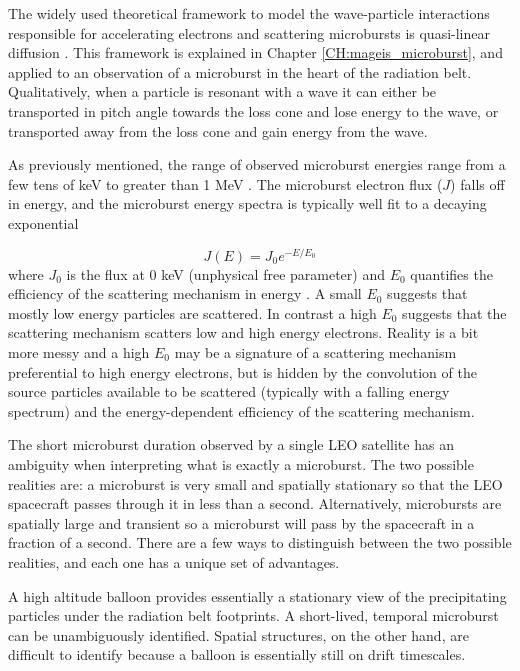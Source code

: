 The widely used theoretical framework to model the wave-particle interactions responsible for accelerating electrons and scattering microbursts is quasi-linear diffusion \citep[e.g.][]{Walker1993, Summers1998, Meredith2002, Horne2005, Thorne2005, Summers2005}. This framework is explained in Chapter \ref{CH:mageis_microburst}, and applied to an observation of a microburst in the heart of the radiation belt. Qualitatively, when a particle is resonant with a wave it can either be transported in pitch angle towards the loss cone and lose energy to the wave, or transported away from the loss cone and gain energy from the wave.

As previously mentioned, the range of observed microburst energies range from a few tens of keV \citep[e.g][]{Datta1997, Parks1967} to greater than 1 MeV \citep[e.g.][]{Blake1996, Greeley2019}. The microburst electron flux ($J$) falls off in energy, and the microburst energy spectra is typically well fit to a decaying exponential 

\begin{equation}
J(E) = J_0 e^{-E/E_0}
\end{equation} where $J_0$ is the flux at 0 keV (unphysical free parameter) and $E_0$ quantifies the efficiency of the scattering mechanism in energy \citep[e.g.][]{Parks1967, Datta1997, Lee2005}. A small $E_0$ suggests that mostly low energy particles are scattered. In contrast a high $E_0$ suggests that the scattering mechanism scatters low and high energy electrons. Reality is a bit more messy and a high $E_0$ may be a signature of a scattering mechanism preferential to high energy electrons, but is hidden by the convolution of the source particles available to be scattered (typically with a falling energy spectrum) and the energy-dependent efficiency of the scattering mechanism.

The short microburst duration observed by a single LEO satellite has an ambiguity when interpreting what is exactly a microburst. The two possible realities are: a microburst is very small and spatially stationary so that the LEO spacecraft passes through it in less than a second. Alternatively, microbursts are spatially large and transient so a microburst will pass by the spacecraft in a fraction of a second. There are a few ways to distinguish between the two possible realities, and each one has a unique set of advantages.

A high altitude balloon provides essentially a stationary view of the precipitating particles under the radiation belt footprints. A short-lived, temporal microburst can be unambiguously identified. Spatial structures, on the other hand, are difficult to identify because a balloon is essentially still on drift timescales.

